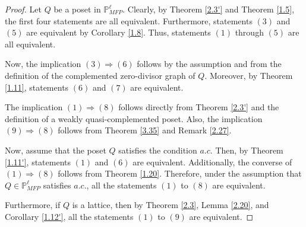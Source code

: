 \documentclass[10pt,one side,emlines]{amsart}
\theoremstyle{definition}
\begin{document}
\begin{proof} Let $Q$ be a poset in $\mathbb{P}^{\ell}_{MFP}$.
Clearly, by Theorem \ref{2.3'} and Theorem \ref{1.5}, the first four statements are all equivalent. Furthermore, statements $(3)$ and $(5)$ are equivalent by Corollary \ref{1.8}. Thus, statements $(1)$ through $(5)$ are all equivalent.
	
Now, the implication $(3) \Rightarrow (6)$ follows by the assumption and from the definition of the complemented zero-divisor graph of $Q$. Moreover, by Theorem \ref{1.11}, statements $(6)$ and $(7)$ are equivalent.
	
The implication $(1) \Rightarrow (8)$ follows directly from Theorem \ref{2.3'} and the definition of a weakly quasi-complemented poset. Also, the implication $(9) \Rightarrow (8)$ follows from Theorem \ref{3.35} and Remark \ref{2.27}.
	
Now, assume that the poset $Q$ satisfies the condition $a.c.$ Then, by Theorem \ref{1.11'}, statements $(1)$ and $(6)$ are equivalent. Additionally, the converse of $(1) \Rightarrow (8)$ follows from Theorem \ref{1.20}. Therefore, under the assumption that $Q \in \mathbb{P}^{\ell}_{MFP}$ satisfies $a.c.$, all the statements $(1)$ to $(8)$ are equivalent.
	
Furthermore, if $Q$ is a lattice, then by Theorem \ref{2.3}, Lemma \ref{2.20}, and Corollary \ref{1.12'}, all the statements $(1)$ to $(9)$ are equivalent.
\end{proof}
\end{document}
